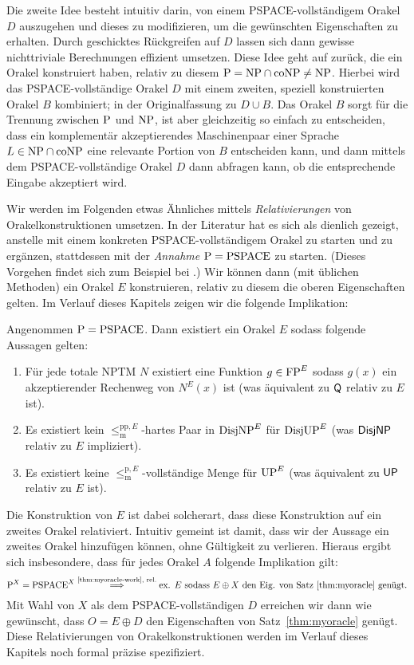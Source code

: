 Die zweite Idee besteht intuitiv darin, von einem PSPACE-vollständigem Orakel $D$ auszugehen und dieses zu modifizieren, um die gewünschten Eigenschaften zu erhalten. Durch geschicktes Rückgreifen auf $D$ lassen sich dann gewisse nichttriviale Berechnungen effizient umsetzen. Diese Idee geht auf \textcite{baker_relativizations_1975} zurück, die ein Orakel konstruiert haben, relativ zu diesem $\P=\NP\cap\coNP\neq\NP$. Hierbei wird das PSPACE-vollständige Orakel $D$ mit einem zweiten, speziell konstruierten Orakel $B$ kombiniert; in der Originalfassung zu $D\cup B$. Das Orakel $B$ sorgt für die Trennung zwischen $\P$ und $\NP$, ist aber gleichzeitig so einfach zu entscheiden, dass ein komplementär akzeptierendes Maschinenpaar einer Sprache $L\in\NP\cap\coNP$ eine relevante Portion von $B$ entscheiden kann, und dann mittels dem PSPACE-vollständige Orakel $D$ dann abfragen kann, ob die entsprechende Eingabe akzeptiert wird.

Wir werden im Folgenden etwas Ähnliches mittels \emph{Relativierungen} von Orakelkonstruktionen umsetzen.
In der Literatur hat es sich als dienlich gezeigt, anstelle mit einem konkreten PSPACE-vollständigem Orakel zu starten und zu ergänzen, stattdessen mit der \emph{Annahme} $\P=\mathrm{PSPACE}$ zu starten. (Dieses Vorgehen findet sich zum Beispiel bei \cites{blum_generic_1987}{fortnow_separability_2002}{fenner_oracle_2003}.) 
Wir können dann (mit üblichen Methoden) ein Orakel $E$ konstruieren, relativ zu diesem die oberen Eigenschaften gelten. Im Verlauf dieses Kapitels zeigen wir die folgende Implikation:
\begin{theorem}\label{thm:myoracle-work}
    Angenommen $\P=\mathrm{PSPACE}$. Dann existiert ein Orakel $E$ sodass folgende Aussagen gelten:
    \begin{enumerate}
        \item Für jede totale NPTM $N$ existiert eine Funktion $g\in\FP^E$ sodass $g(x)$ ein akzeptierender Rechenweg von $N^E(x)$ ist (was äquivalent zu $\hQ$ relativ zu $E$ ist).
        \item Es existiert kein $\leq_\mathrm{m}^{\mathrm{pp},E}$-hartes Paar in $\DisjNP^E$ für $\DisjUP^E$ (was $\hDisjNP$ relativ zu $E$ impliziert).
        \item Es existiert keine $\leq_\mathrm{m}^{\mathrm{p},E}$-vollständige Menge für $\UP^E$ (was äquivalent zu $\hUP$ relativ zu $E$ ist).
    \end{enumerate}
\end{theorem}
Die Konstruktion von $E$ ist dabei solcherart, dass diese Konstruktion auf ein zweites Orakel relativiert. 
Intuitiv gemeint ist damit, dass wir der Aussage ein zweites Orakel hinzufügen können, ohne Gültigkeit zu verlieren. Hieraus ergibt sich insbesondere, dass für jedes Orakel $A$ folgende Implikation gilt:
\[ \P^X=\mathrm{PSPACE}^X \stackrel{\text{\ref{thm:myoracle-work}, rel.}}{\implies} \text{ex. $E$ sodass $E\oplus X$ den Eig. von Satz~\ref{thm:myoracle} genügt.} \]
Mit Wahl von $X$ als dem PSPACE-vollständigen $D$ erreichen wir dann wie gewünscht, dass $O=E\oplus D$ den Eigenschaften von Satz~\ref{thm:myoracle} genügt.
Diese Relativierungen von Orakelkonstruktionen werden im Verlauf dieses Kapitels noch formal präzise spezifiziert.


